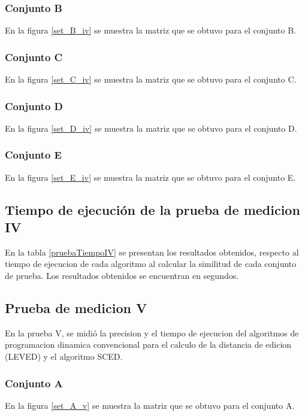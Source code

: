 \subsubsection{Conjunto B}
En la figura \ref{set_B_iv} se muestra la matriz que se obtuvo para el conjunto B.


\subsubsection{Conjunto C}
En la figura \ref{set_C_iv} se muestra la matriz que se obtuvo para el conjunto C.


\subsubsection{Conjunto D}
En la figura \ref{set_D_iv} se muestra la matriz que se obtuvo para el conjunto D.


\subsubsection{Conjunto E}
En la figura \ref{set_E_iv} se muestra la matriz que se obtuvo para el conjunto E.



\subsection{Tiempo de ejecución de la prueba de medicion IV}
En la tabla \ref{pruebaTiempoIV} se presentan los resultados obtenidos, respecto al tiempo de ejecucion de cada algoritmo al calcular la similitud de cada conjunto de prueba. Los resultados obtenidos se encuentran en segundos.



\subsection{Prueba de medicion V}
En la prueba V, se midió la precision y el tiempo de ejecucion del algoritmos de programacion dinamica convencional para el calculo de la distancia de edicion (LEVED) y el algoritmo SCED.

\subsubsection{Conjunto A}
En la figura \ref{set_A_v} se muestra la matriz que se obtuvo para el conjunto A.


